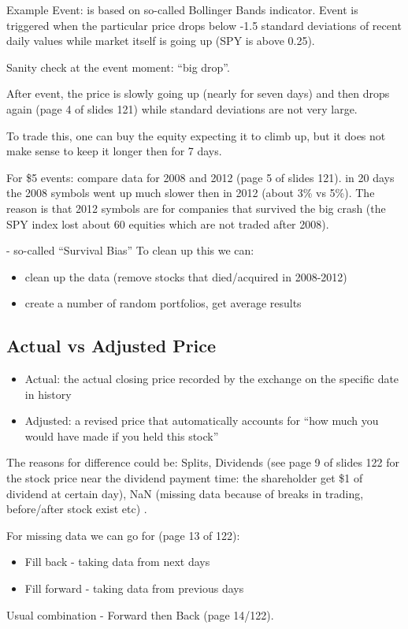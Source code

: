 \documentclass{scrartcl}
\begin{document}
Example Event: is based on so-called Bollinger Bands indicator. Event is
triggered when the particular price drops below -1.5 standard deviations of
recent daily values while market itself is going up (SPY is above 0.25).

Sanity check at the event moment: ``big drop''.

After event, the price is slowly going up (nearly for seven days) and then drops
again (page 4 of slides 121) while standard deviations are not very large. 

To trade this, one can buy the equity expecting it to climb up, but it does not
make sense to keep it longer then for 7 days.

For \$5 events: compare data for 2008 and 2012 (page 5 of slides 121). in 20
days the 2008 symbols went up much slower then in 2012 (about 3\% vs 5\%). The
reason is that 2012 symbols are for companies that survived the big crash (the
SPY index lost about 60 equities which are not traded after 2008).

- so-called ``Survival Bias'' To clean up this we can:
\begin{itemize}
\item clean up the data (remove stocks that died/acquired in 2008-2012)
\item create a number of random portfolios, get average results
\end{itemize}

\subsection{Actual vs Adjusted Price}
\label{sec:ActualVsAdjustedPrive}
\begin{itemize}
\item Actual: the actual closing price recorded by the exchange on the specific
  date in history
\item Adjusted: a revised price that automatically accounts for ``how much you
  would have made if you held this stock''
\end{itemize}
The reasons for difference could be: Splits, Dividends (see page 9 of slides 122
for the stock price near the dividend payment time: the shareholder get \$1 of
dividend at certain day), NaN (missing data because of breaks in trading,
before/after stock exist etc) .

For missing data we can go for (page 13 of 122): 
\begin{itemize}
\item Fill back - taking data from next days
\item Fill forward - taking data from previous days
\end{itemize}
Usual combination - Forward then Back (page 14/122).
\end{document}
